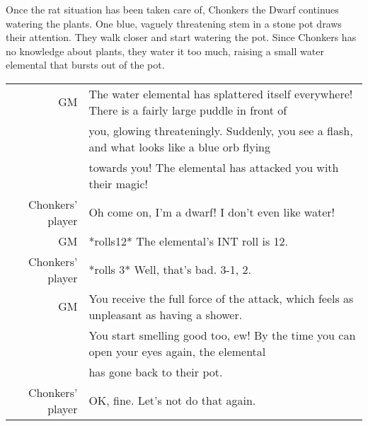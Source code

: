 Once the rat situation has been taken care of, Chonkers the Dwarf continues watering the plants. One blue, vaguely threatening stem in a stone pot draws their attention. They walk closer and start watering the pot. Since Chonkers has no knowledge about plants, they water it too much, raising a small water elemental that bursts out of the pot.

\begin{tabular}{rl}
GM& The water elemental has splattered itself everywhere! There is a fairly large puddle in front of \\
& you, glowing threateningly. Suddenly, you see a flash, and what looks like a blue orb flying \\
& towards you! The elemental has attacked you with their magic!\\
Chonkers' player& Oh come on, I'm a dwarf! I don't even like water!\\
GM& *rolls12* The elemental's INT roll is 12.\\
Chonkers' player& *rolls 3* Well, that's bad. 3-1, 2. \\
GM& You receive the full force of the attack, which feels as unpleasant as having a shower. \\
& You start smelling good too, ew! By the time you can open your eyes again, the elemental \\
& has gone back to their pot.\\
Chonkers' player& OK, fine. Let's not do that again.\\

\end{tabular}